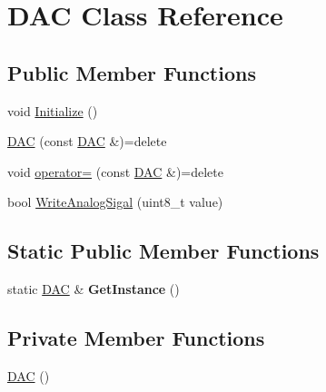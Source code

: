 \hypertarget{class_d_a_c}{}\section{D\+AC Class Reference}
\label{class_d_a_c}
\subsection*{Public Member Functions}
\begin{DoxyCompactItemize}
\item 
void \hyperlink{class_d_a_c_a834456c539ee1936f7da8e4bfaa407f0}{Initialize} ()
\item 
\hyperlink{class_d_a_c_af656669246f70c7ccbbd05d0e65088d4}{D\+AC} (const \hyperlink{class_d_a_c}{D\+AC} \&)=delete
\item 
void \hyperlink{class_d_a_c_a9e16a3d53b57588cba0ff2f9ade78e6b}{operator=} (const \hyperlink{class_d_a_c}{D\+AC} \&)=delete
\item 
bool \hyperlink{class_d_a_c_ae7d843a3795822e893fb2b2d996b0666}{Write\+Analog\+Sigal} (uint8\+\_\+t value)
\end{DoxyCompactItemize}
\subsection*{Static Public Member Functions}
\begin{DoxyCompactItemize}
\item 
static \hyperlink{class_d_a_c}{D\+AC} \& {\bfseries Get\+Instance} ()\hypertarget{class_d_a_c_aa97df751677eb0db87b3e3a5a1cb6049}{}\label{class_d_a_c_aa97df751677eb0db87b3e3a5a1cb6049}

\end{DoxyCompactItemize}
\subsection*{Private Member Functions}
\begin{DoxyCompactItemize}
\item 
\hyperlink{class_d_a_c_a9908e07a5c096380eeb4c4061d58476d}{D\+AC} ()
\end{DoxyCompactItemize}
